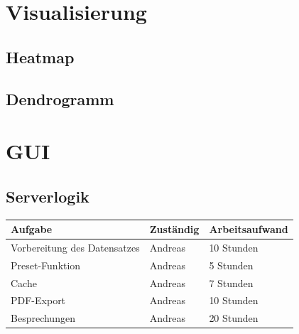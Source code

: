\documentclass[12pt]{article}
\begin{document}
\newpage
\pagestyle{fancy}
\fancyhead{}
\section{Visualisierung}
\label{visualisierung}

\subsection{Heatmap}
\label{heatmap}

\subsection{Dendrogramm}
\label{dendrogramm}

\newpage
\pagestyle{fancy}
\fancyhead{}
\section{GUI}
\label{gui}

\subsection{Serverlogik}
\label{serverlogik}

\begin{table}[]
	\begin{tabular}{l|l|l}
		Aufgabe                       & Zuständig & Arbeitsaufwand \\ 
		\hline
		Vorbereitung des Datensatzes  & Andreas   & 10 Stunden     \\
		Preset-Funktion               & Andreas   & 5 Stunden      \\ 
		Cache                         & Andreas   & 7 Stunden      \\ 
		PDF-Export			          & Andreas   & 10 Stunden     \\
		Besprechungen 				  & Andreas   & 20 Stunden     \\
	\end{tabular}
\end{table}
\end{document}
